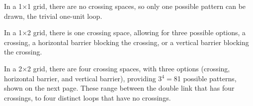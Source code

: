 
In a 1$\times$1 grid, there are no crossing spaces, so only one possible pattern can be drawn, the trivial one-unit loop.
\begin{marginfigure}[+3.5cm]
\begin{flushright}
\scalebox{0.7}{

}
\end{flushright}
\end{marginfigure}
\vspace{0.5cm}

\begin{center}

\end{center}

\vspace{0.5cm}


\noindent
In a 1$\times$2 grid, there is one crossing space, allowing for three possible options, a crossing, a horizontal barrier blocking the crossing, or a vertical barrier blocking the crossing.

\vspace{0.5cm}

\begin{center}
\hspace{0.5cm}
\hspace{0.5cm}

\end{center}

\vspace{0.5cm}

\noindent
In a 2$\times$2 grid, there are four crossing spaces, with three options (crossing, horizontal barrier, and vertical barrier), providing 3$^4=$81 possible patterns, shown on the next page. These range between the double link that has four crossings, to four distinct loops that have no crossings.

\vspace{0.5cm}
\begin{center}

\hspace{0.5cm}

\end{center}

\newpage


\noindent
\scalebox{0.6}{
\begin{minipage}{18cm}

\end{minipage}
}
